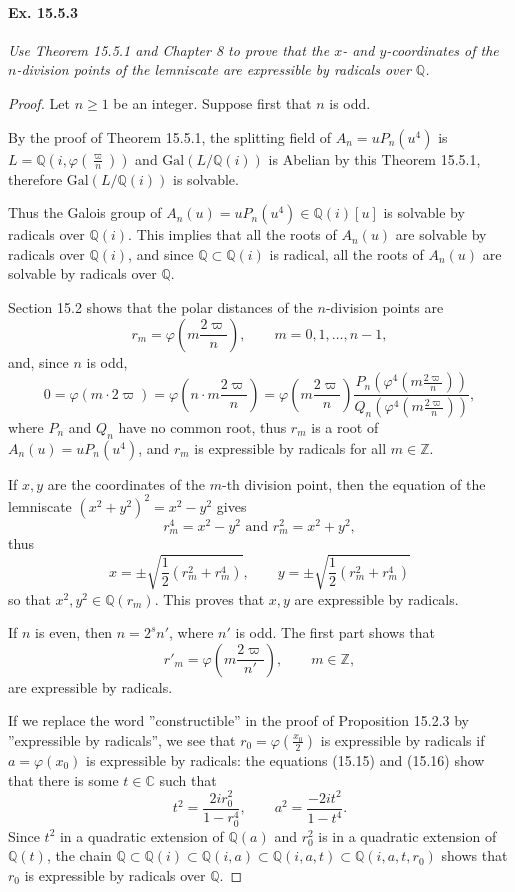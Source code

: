 \documentclass[11pt,a4paper]{article}
\newcommand{\Q}{\mathbb{Q}}
\newcommand{\Z}{\mathbb{Z}}
\newcommand{\C}{\mathbb{C}}
\newcommand{\Gal}{\mathrm{Gal}}
\begin{document}
\paragraph{Ex. 15.5.3}{\it Use Theorem 15.5.1 and Chapter 8 to prove that the $x$- and $y$-coordinates of the $n$-division points of the lemniscate are expressible by radicals over $\Q$.
}
\begin{proof} 
Let $n \geq 1$ be an integer. Suppose first that $n$ is  odd.

By the proof of Theorem 15.5.1, the splitting field of $A_n = uP_n(u^4)$ is $L = \Q\left(i,\varphi\left(\frac{\varpi}{n}\right)\right)$ and $\Gal(L/\Q(i))$  is Abelian by this Theorem 15.5.1, therefore $\Gal(L/\Q(i))$ is solvable. 

Thus the Galois group of $A_n(u)  =  u P_n(u^4)\in \Q(i)[u]$ is solvable by radicals over $\Q(i)$. This implies that all the roots of $A_n(u)$ are solvable by radicals over $\Q(i)$, and since $\Q \subset \Q(i)$ is radical, all the roots of $A_n(u)$ are solvable by radicals over $\Q$. 

 Section 15.2 shows that the polar distances of the $n$-division points are
 $$r_m = \varphi\left( m \frac{2\varpi}{n} \right), \qquad m=0,1,\ldots,n-1,$$
and, since $n$ is odd,
$$0 = \varphi(m\cdot 2\varpi) = \varphi\left(n \cdot m \frac{2\varpi}{n} \right) = \varphi\left(m \frac{2\varpi}{n} \right) \frac{P_n\left( \varphi^4\left(m \frac{2\varpi}{n}\right)\right)}{Q_n\left( \varphi^4\left(m \frac{2\varpi}{n}\right)\right)},$$
where $P_n$ and $Q_n$ have no common root, thus $r_m$ is a root of $A_n(u) = u P_n(u^4)$, and $r_m$ is expressible by radicals for all $m \in \Z$.

If $x,y$ are the coordinates of the $m$-th division point, then the equation of the lemniscate $(x^2 + y^2)^2 = x^2 -y^2$ gives
$$r_m^4 = x^2 - y^2 \text{ and }  r_m^2 = x^2 + y^2,$$
thus
$$x  = \pm \sqrt{\frac{1}{2}(r_m^2 + r_m^4)},\qquad y =  \pm \sqrt{\frac{1}{2}(r_m^2 + r_m^4)}$$
so that $x^2,y^2 \in \Q(r_m)$. This proves that $x,y$ are expressible by radicals.

\bigskip

If $n$ is even, then $n = 2^s n'$, where $n'$ is odd. The first part shows that 
 $$r'_m = \varphi\left( m \frac{2\varpi}{n'} \right), \qquad m \in \Z,$$
 are expressible by radicals.


If we replace the word ''constructible'' in the proof of Proposition 15.2.3 by ''expressible by radicals'', we see that $r_0 = \varphi\left(\frac{x_0}{2}\right)$ is expressible by radicals if $a = \varphi(x_0)$ is expressible by radicals: the equations (15.15) and (15.16) show that there is some $t \in \C$ such that
$$t^2 = \frac{2ir_0^2}{1 - r_0^4},\qquad a^2 = \frac{-2it^2}{1-t^4}.$$
Since $t^2$ in a quadratic extension of $\Q(a)$ and $r_0^2$ is in a quadratic extension of $\Q(t)$, the chain $\Q \subset \Q(i) \subset \Q(i,a) \subset \Q(i,a,t) \subset \Q(i,a,t,r_0)$ shows that $r_0$ is expressible by radicals over $\Q$.


\end{proof}
\end{document}
